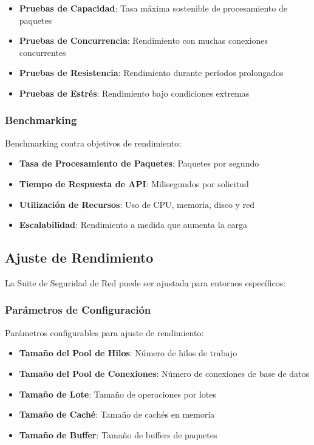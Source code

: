 \begin{itemize}
    \item \textbf{Pruebas de Capacidad}: Tasa máxima sostenible de procesamiento de paquetes
    \item \textbf{Pruebas de Concurrencia}: Rendimiento con muchas conexiones concurrentes
    \item \textbf{Pruebas de Resistencia}: Rendimiento durante períodos prolongados
    \item \textbf{Pruebas de Estrés}: Rendimiento bajo condiciones extremas
\end{itemize}

\subsubsection{Benchmarking}
Benchmarking contra objetivos de rendimiento:

\begin{itemize}
    \item \textbf{Tasa de Procesamiento de Paquetes}: Paquetes por segundo
    \item \textbf{Tiempo de Respuesta de API}: Milisegundos por solicitud
    \item \textbf{Utilización de Recursos}: Uso de CPU, memoria, disco y red
    \item \textbf{Escalabilidad}: Rendimiento a medida que aumenta la carga
\end{itemize}

\subsection{Ajuste de Rendimiento}
La Suite de Seguridad de Red puede ser ajustada para entornos específicos:

\subsubsection{Parámetros de Configuración}
Parámetros configurables para ajuste de rendimiento:

\begin{itemize}
    \item \textbf{Tamaño del Pool de Hilos}: Número de hilos de trabajo
    \item \textbf{Tamaño del Pool de Conexiones}: Número de conexiones de base de datos
    \item \textbf{Tamaño de Lote}: Tamaño de operaciones por lotes
    \item \textbf{Tamaño de Caché}: Tamaño de cachés en memoria
    \item \textbf{Tamaño de Buffer}: Tamaño de buffers de paquetes
\end{itemize}

